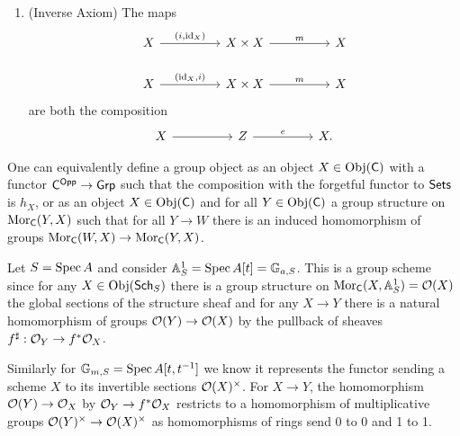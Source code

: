 \begin{definition}
\begin{enumerate}[label=(\alph*)]
        \item (Inverse Axiom) The maps
        $$%
        \begin{tikzcd}
            X && {X\times X} && X \\
            X && {X\times X} && X
            \arrow["{(i,\id_{X})}", from=1-1, to=1-3]
            \arrow["m", from=1-3, to=1-5]
            \arrow["{(\id_{X},i)}", from=2-1, to=2-3]
            \arrow["m", from=2-3, to=2-5]
        \end{tikzcd}$$
        are both the composition 
        $$%
        \begin{tikzcd}
            X && Z && X.
            \arrow[from=1-1, to=1-3]
            \arrow["e", from=1-3, to=1-5]
        \end{tikzcd}$$
    \end{enumerate}
\end{definition}
One can equivalently define a group object as an object $X\in\mathrm{Obj}(\mathsf{C})$ with a functor $\mathsf{C}^{\mathsf{Opp}}\to\mathsf{Grp}$ such that the composition with the forgetful functor to $\mathsf{Sets}$ is $h_{X}$, or as an object $X\in\mathrm{Obj}(\mathsf{C})$ and for all $Y\in\mathrm{Obj}(\mathsf{C})$ a group structure on $\mathrm{Mor}_{\mathsf{C}}(Y,X)$ such that for all $Y\to W$ there is an induced homomorphism of groups $\mathrm{Mor}_{\mathsf{C}}(W,X)\to\mathrm{Mor}_{\mathsf{C}}(Y,X)$. 
\begin{example}
    Let $S=\operatorname{Spec} A$ and consider $\mathbb{A}^{1}_{S}=\operatorname{Spec} A[t]=\mathbb{G}_{a,S}$. This is a group scheme since for any $X\in\mathrm{Obj}(\mathsf{Sch}_{S})$ there is a group structure on $\mathrm{Mor}_{\mathsf{C}}(X,\mathbb{A}^{1}_{S})=\mathcal{O}(X)$ the global sections of the structure sheaf and for any $X\to Y$ there is a natural homomorphism of groups $\mathcal{O}(Y)\to\mathcal{O}(X)$ by the pullback of sheaves $f^{\sharp}:\mathcal{O}_{Y}\to f^{*}\mathcal{O}_{X}$. 
\end{example}
\begin{example}
    Similarly for $\mathbb{G}_{m,S}=\operatorname{Spec} A[t,t^{-1}]$ we know it represents the functor sending a scheme $X$ to its invertible sections $\mathcal{O}(X)^{\times}$. For $X\to Y$, the homomorphism $\mathcal{O}(Y)\to\mathcal{O}_{X}$ by $\mathcal{O}_{Y}\to f^{*}\mathcal{O}_{X}$ restricts to a homomorphism of multiplicative groups $\mathcal{O}(Y)^{\times}\to\mathcal{O}(X)^{\times}$ as homomorphisms of rings send 0 to 0 and 1 to 1. 
\end{example}
